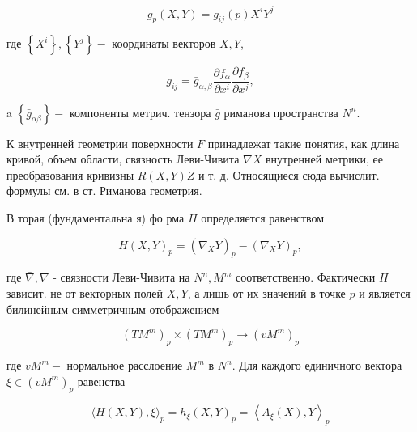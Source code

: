 \documentclass[10pt]{article}
\begin{document}
\[

g_{p}(X, Y)=g_{i j}(p) X^{i} Y^{j}

\]



где $\left\{X^{i}\right\},\left\{Y^{j}\right\}-$ координаты векторов $X, Y$,



\[

g_{i j}=\bar{g}_{\alpha, \beta} \frac{\partial f_{\alpha}}{\partial x^{i}} \frac{\partial f_{\beta}}{\partial x^{j}},

\]



a $\left\{\bar{g}_{\alpha \beta}\right\}-$ компоненты метрич. тензора $\bar{g}$ риманова пространства $N^{n}$.



К внутренней геометрии поверхности $F$ принадлежат такие понятия, как длина кривой, объем области, связность Леви-Чивита $\nabla X$ внутренней метрики, ее преобразования кривизны $R(X, Y) Z$ и т. д. Относящиеся сюда вычислит. формулы см. в ст. Риманова геометрия.



В торая (фундаментальна я) фо рма $H$ определяется равенством



\[

H(X, Y)_{p}=\left(\bar{\nabla}_{X} Y\right)_{p}-\left(\nabla_{X} Y\right)_{p},

\]



где $\bar{\nabla}, \nabla$ - связности Леви-Чивита на $N^{n}, M^{m}$ соответственно. Фактически $H$ зависит. не от векторных полей $X, Y$, а лишь от их значений в точке $p$ и является билинейным симметричным отображением



\[

\left(T M^{m}\right)_{p} \times\left(T M^{m}\right)_{p} \rightarrow\left(v M^{m}\right)_{p}

\]



где $v M^{m}-$ нормальное расслоение $M^{m}$ в $N^{n}$. Для каждого единичного вектора $\xi \in\left(v M^{m}\right)_{p}$ равенства



\[

\langle H(X, Y), \xi\rangle_{p}=h_{\xi}(X, Y)_{p}=\left\langle A_{\xi}(X), Y\right\rangle_{p}

\]
\end{document}
